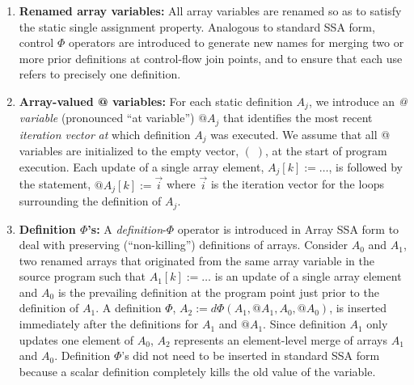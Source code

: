 \begin{enumerate}
\item {\bf Renamed array variables:}
All array variables are renamed so as to 
satisfy the static single assignment property.  Analogous to standard SSA
form, control $\Phi$ operators are introduced to generate new names
for merging two or more prior definitions at control-flow join points, and to ensure that each use
refers to precisely one definition.

\item {\bf Array-valued @ variables:}
For each static definition
$A_j$, we introduce an {\em @ variable} (pronounced ``at variable'')
$@A_j$ that identifies
the most recent {\em iteration vector} {\it
at} which definition $A_j$ was executed.
We assume that all @ variables are initialized to the empty
vector, $ (\;)$, at the start of program execution.  
Each update of a single array element, $A_j[k] := \ldots$, 
is followed by the statement, $@A_j[k] := \vec{i}$
where $\vec{i}$ is the iteration vector for the loops surrounding
the definition of $A_j$.


\item {\bf Definition $\Phi$'s:}
\label{def:phi}
A  {\it definition}-$\Phi$ operator is 
introduced in Array SSA form to deal with preserving (``non-killing'') definitions
of arrays.  Consider $A_0$ and $A_1$, two renamed 
arrays that originated from the same array variable in the source program
such that $A_1[k] := \ldots$
is an update of a single array element
and $A_0$ is the prevailing definition at the program point just
prior to the definition of $A_1$.
A definition $\Phi$, $A_2 := d\Phi(A_1, @A_1, A_0, @A_0)$,
is inserted immediately after the definitions for $A_1$ and $@A_1$.
Since definition $A_1$ only updates one element of $A_0$, $A_2$ represents
an element-level merge of arrays $A_1$ and $A_0$.
Definition $\Phi$'s did not need to be
inserted in standard SSA form because a scalar definition completely kills the old value of
the variable.  



\end{enumerate}
